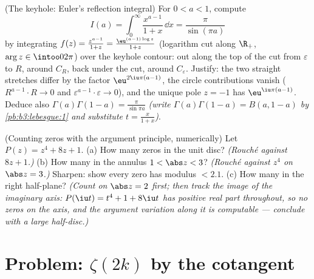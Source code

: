 \begin{exercise}[$\star\star\star$]\label{exo:b3:residues:11}
(The keyhole: Euler's reflection integral) For $0 < a < 1$,
compute
\[
I(a) = \int_0^{\infty}\frac{x^{a-1}}{1 + x}\,\dd x =
\frac{\pi}{\sin(\pi a)}
\]
by integrating $f(z) = \frac{z^{a-1}}{1+z} =
\frac{\eu^{(a-1)\log z}}{1 + z}$ (logarithm cut along
$\R_+$, $\arg z \in \intoo0{2\pi}$) over the keyhole
contour: out along the top of the cut from $\varepsilon$ to
$R$, around $C_R$, back under the cut, around
$C_\varepsilon$. Justify: the two straight stretches differ
by the factor $\eu^{2\iu\pi(a-1)}$, the circle contributions
vanish ($R^{a-1}\cdot R \to 0$ and
$\varepsilon^{a-1}\cdot\varepsilon \to 0$), and the unique
pole $z = -1$ has  $\eu^{\iu\pi(a - 1)}$. Deduce also
$\Gamma(a)\Gamma(1 - a) = \frac\pi{\sin\pi a}$ \emph{(write
$\Gamma(a)\Gamma(1-a) = B(a, 1-a)$ by
\cref{pb:b3:lebesgue:1} and substitute $t =
\frac{x}{1+x}$)}.
\end{exercise}

\begin{exercise}[$\star\star$]\label{exo:b3:residues:12}
(Counting zeros with the argument principle, numerically)
Let $P(z) = z^4 + 8z + 1$.
(a) How many zeros in the unit disc? \emph{(Rouch\'e against
$8z + 1$.)}
(b) How many in the annulus $1 < \abs z < 3$?
\emph{(Rouch\'e against $z^4$ on $\abs z = 3$.)} Sharpen:
show every zero has modulus $< 2.1$.
(c) How many in the right half-plane? \emph{(Count on
$\abs z = 2$ first; then track the image of the imaginary
axis: $P(\iu t) = t^4 + 1 + 8\iu t$ has positive real part
throughout, so no zeros on the axis, and the argument
variation along it is computable --- conclude with a large
half-disc.)}
\end{exercise}

\section{Problem: \texorpdfstring{$\zeta(2k)$}{zeta(2k)} by the
cotangent}


